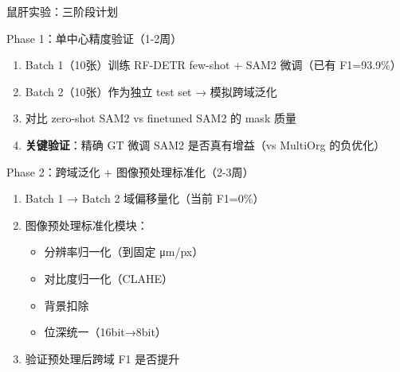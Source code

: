 \documentclass[aspectratio=169, 10pt]{beamer}
\begin{document}
\begin{frame}{鼠肝实验：三阶段计划}
  \begin{block}{Phase 1：单中心精度验证（1-2周）}
    \begin{enumerate}
      \item Batch 1（10张）训练 RF-DETR few-shot + SAM2 微调（已有 F1=93.9\%）
      \item Batch 2（10张）作为独立 test set → 模拟跨域泛化
      \item 对比 zero-shot SAM2 vs finetuned SAM2 的 mask 质量
      \item \textbf{关键验证}：精确 GT 微调 SAM2 是否真有增益（vs MultiOrg 的负优化）
    \end{enumerate}
  \end{block}
  \vspace{0em}
  \begin{block}{Phase 2：跨域泛化 + 图像预处理标准化（2-3周）}
    \begin{enumerate}
      \item Batch 1 → Batch 2 域偏移量化（当前 F1=0\%）
      \item 图像预处理标准化模块：
        \begin{itemize}
          \item 分辨率归一化（到固定 μm/px）
          \item 对比度归一化（CLAHE）
          \item 背景扣除
          \item 位深统一（16bit→8bit）
        \end{itemize}
      \item 验证预处理后跨域 F1 是否提升
    \end{enumerate}
  \end{block}
\end{frame}
\end{document}
